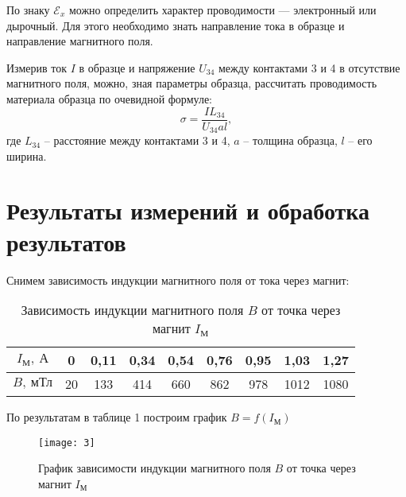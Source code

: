 По знаку $\mathscr{E}_x$ можно определить характер
проводимости — электронный или дырочный.
Для этого необходимо знать направление
тока в образце и направление магнитного
поля.

Измерив ток $I$ в образце и напряжение
$U_{34}$ 
между контактами 3 и 4 в отсутствие
магнитного поля, можно, зная параметры
образца, рассчитать проводимость
материала образца по очевидной формуле:
\begin{equation}
    \sigma = \frac{I L_{34}}{U_{34} a
    l},
\end{equation}
где $L_{34}$ -- расстояние между
контактами 3 и 4, $a$ -- толщина
образца, $l$ -- его ширина.

\section{Результаты измерений и обработка результатов}

Снимем зависимость индукции магнитного
поля от тока через магнит:
\renewcommand{\arraystretch}{1.1} 
\begin{table}[H]
\centering
\begin{tabular}{|c|c|c|c|c|c|c|c|c|}
\hline
$I_\text{М}, \ \text{А}$   & 0  & 0,11 & 0,34 & 0,54 & 0,76
       & 0,95 & 1,03 & 1,27 \\ \hline
$B, \ \text{мТл} $ & 20 & 133  & 414  & 660  & 862
       & 978  & 1012 & 1080 \\ \hline
\end{tabular}
\caption{Зависимость индукции магнитного
поля $B$ от точка через магнит
$I_\text{М}$}
\end{table}

По результатам в таблице 1 построим
график $B=f(I_\text{М})$


\begin{figure}[H]
    \texttt{[image: 3]} 
    \captionsetup{justification=centering}
    \caption{График зависимости индукции магнитного
поля $B$ от точка через магнит
$I_\text{М}$}
\end{figure}

